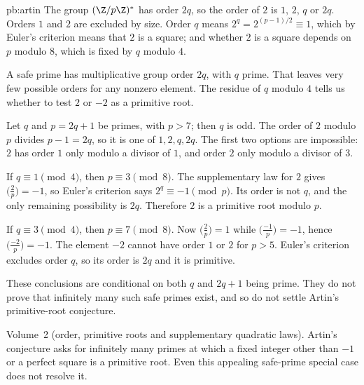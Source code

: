\begin{solution}{pb:artin}
\idea The group $(\Z/p\Z)^*$ has order $2q$, so the order of $2$ is $1$, $2$, $q$ or $2q$. Orders $1$ and $2$ are excluded by size. Order
$q$ means $2^q=2^{(p-1)/2}\equiv1$, which by Euler's criterion means that $2$ is a square; and whether $2$ is a square depends on $p$
modulo $8$, which is fixed by $q$ modulo $4$.

\writeup
A safe prime has multiplicative group order $2q$, with $q$ prime. That leaves very few possible orders for any nonzero element. The residue of $q$ modulo $4$ tells us whether to test $2$ or $-2$ as a primitive root.

 Let $q$ and $p=2q+1$ be primes, with $p>7$; then $q$ is odd. The order of $2$ modulo $p$ divides $p-1=2q$, so it is one of $1,2,q,2q$. The first two options are impossible: $2$ has order $1$ only modulo a divisor of $1$, and order $2$ only modulo a divisor of $3$.

If $q\equiv1\pmod4$, then $p\equiv3\pmod8$. The supplementary law for $2$ gives
$\bigl(\frac2p\bigr)=-1$, so Euler's criterion says
$2^q\equiv-1\pmod p$. Its order is not $q$, and the only remaining possibility is $2q$. Therefore $2$ is a primitive root modulo $p$.

If $q\equiv3\pmod4$, then $p\equiv7\pmod8$. Now
$\bigl(\frac2p\bigr)=1$ while $\bigl(\frac{-1}p\bigr)=-1$, hence
$\bigl(\frac{-2}p\bigr)=-1$. The element $-2$ cannot have order $1$ or $2$ for $p>5$. Euler's criterion excludes order $q$, so its order is $2q$ and it is primitive.

These conclusions are conditional on both $q$ and $2q+1$ being prime. They do not prove that infinitely many such safe primes exist, and so do not settle Artin's primitive-root conjecture.

\tools Volume~2 (order, primitive roots and supplementary quadratic laws).
\leads Artin's conjecture asks for infinitely many primes at which a fixed integer other than $-1$ or a perfect square is a primitive root. Even this appealing safe-prime special case does not resolve it.
\end{solution}

